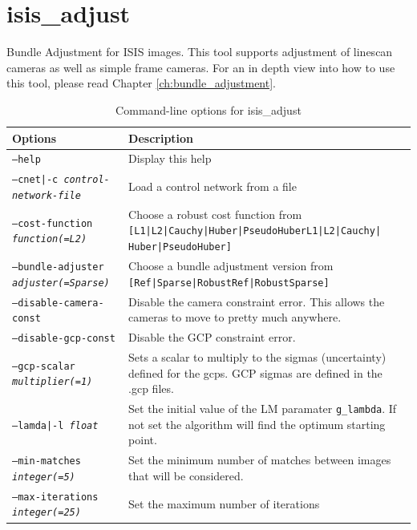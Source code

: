 
\section{isis\_adjust}

Bundle Adjustment for \ac{ISIS} images. This tool supports adjustment of
linescan cameras as well as simple frame cameras. For an in depth view
into how to use this tool, please read Chapter
\ref{ch:bundle_adjustment}.

\begin{longtable}{|l|p{10cm}|}
\caption{Command-line options for isis\_adjust}
\label{tbl:isise_adjust}
\endfirsthead
\endhead
\endfoot
\endlastfoot
\hline
Options & Description \\ \hline \hline
\texttt{--help} & Display this help \\ \hline
\texttt{--cnet|-c \textit{control-network-file}} & Load a control network from a file \\ \hline
\texttt{--cost-function \textit{function(=L2)}} & Choose a robust cost function from \texttt{[L1|L2|Cauchy|Huber|PseudoHuberL1|L2|Cauchy|} \texttt{Huber|PseudoHuber]} \\ \hline
\texttt{--bundle-adjuster \textit{adjuster(=Sparse)}} & Choose a bundle adjustment version from \texttt{[Ref|Sparse|RobustRef|RobustSparse]} \\ \hline
\texttt{--disable-camera-const} & Disable the camera constraint error. This allows the cameras to move to pretty much anywhere. \\ \hline
\texttt{--disable-gcp-const} & Disable the GCP constraint error. \\ \hline
\texttt{--gcp-scalar \textit{multiplier(=1)}} & Sets a scalar to multiply to the sigmas (uncertainty) defined for the gcps. GCP sigmas are defined in the .gcp files. \\ \hline
\texttt{--lamda|-l \textit{float}} & Set the initial value of the LM paramater \texttt{g\_lambda}. If not set the algorithm will find the optimum starting point. \\ \hline
\texttt{--min-matches \textit{integer(=5)}} & Set the minimum number of matches between images that will be considered. \\ \hline
\texttt{--max-iterations \textit{integer(=25)}} & Set the maximum number of iterations \\ \hline

\end{longtable}

